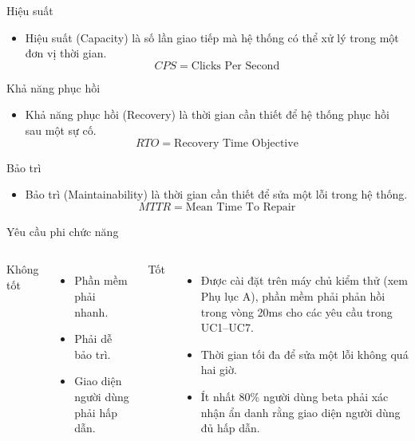 \documentclass{beamer}
\begin{document}
\begin{frame}{Hiệu suất}
    \begin{block}{}
        \begin{itemize}
            \item Hiệu suất (Capacity) là số lần giao tiếp mà hệ thống
            có thể xử lý trong một đơn vị thời gian.
            \[CPS = \text{Clicks Per Second}\]
        \end{itemize}
    \end{block}
\end{frame}

\begin{frame}{Khả năng phục hồi}
    \begin{block}{}
        \begin{itemize}
            \item Khả năng phục hồi (Recovery) là thời gian cần thiết
            để hệ thống phục hồi sau một sự cố.
            \[RTO = \text{Recovery Time Objective}\]
        \end{itemize}
    \end{block}
\end{frame}

\begin{frame}{Bảo trì}
    \begin{block}{}
        \begin{itemize}
            \item Bảo trì (Maintainability) là thời gian cần thiết
            để sửa một lỗi trong hệ thống.
            \[MTTR = \text{Mean Time To Repair}\]
        \end{itemize}
    \end{block}
\end{frame}

\begin{frame}{Yêu cầu phi chức năng}
    \begin{columns}
        {\Huge \color{red}Không tốt}
        \begin{itemize}
            \item Phần mềm phải nhanh.
            \item Phải dễ bảo trì.
            \item Giao diện người dùng phải hấp dẫn.
        \end{itemize}
        {\Huge \color{blue}Tốt}
        \begin{itemize}
            \item Được cài đặt trên máy chủ kiểm thử (xem Phụ lục A),
            phần mềm phải phản hồi trong vòng 20ms
            cho các yêu cầu trong UC1--UC7.
            \item Thời gian tối đa để sửa một lỗi
            không quá hai giờ.
            \item Ít nhất 80\% người dùng beta phải xác nhận
            ẩn danh rằng giao diện người dùng đủ hấp dẫn.
        \end{itemize}
    \end{columns}
\end{frame}
\end{document}
